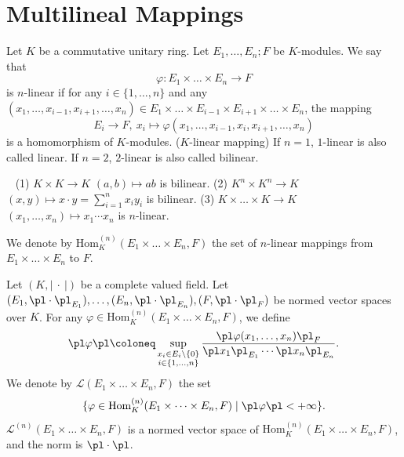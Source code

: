 \section{Multilineal Mappings}
\begin{definitionenv}
    Let $K$ be a commutative unitary ring. Let $E_1,\ldots,E_n;F$ be $K$-modules. We say that 
    $$\varphi:E_1\times\ldots\times E_n\longrightarrow F$$
    is $n$-linear if for any $i\in\{1,\ldots,n\}$ and any $(x_1,\ldots,x_{i-1},x_{i+1},\ldots,x_n)\in E_1\times\ldots\times E_{i-1}\times E_{i+1}\times\ldots\times E_n$, the mapping
    $$E_i\longrightarrow F,\ x_i\mapsto \varphi(x_1,\ldots,x_{i-1},x_i,x_{i+1},\ldots,x_n)$$
    is a homomorphism of $K$-modules. ($K$-linear mapping)
    \newline
    If $n=1$, $1$-linear is also called linear.
    \newline
    If $n=2$, $2$-linear is also called bilinear.
\end{definitionenv}
\begin{exampleenv}
    \ \newline
    (1) $K\times K\longrightarrow K$ $(a,b)\longmapsto ab$ is bilinear.
    \newline
    (2) $K^n\times K^n\longrightarrow K$ $(x,y)\longmapsto x\cdot y=\sum_{i=1}^n x_i y_i$ is bilinear.
    \newline
    (3) $K\times \ldots \times K\longrightarrow K$ $(x_1,\ldots,x_n)\longmapsto x_1\cdots x_n$ is $n$-linear.
\end{exampleenv}
\begin{definitionenv}
    We denote by $\mathrm{Hom}_{K}^{(n)} (E_1\times\ldots\times E_n,F)$ the set of $n$-linear mappings from $E_1\times\ldots\times E_n$ to $F$.
\end{definitionenv}
\begin{definitionenv}
    Let $(K,\left|\ \cdot\ \right|)$ be a complete valued field. 
    \newline
    Let $(E_1,\pl\cdot\pl_{E_1}),\ldots,(E_n,\pl\cdot\pl_{E_n}),(F,\pl\cdot\pl_F)$ be normed vector spaces over $K$. For any $\varphi\in \mathrm{Hom}_{K}^{(n)}(E_1\times\ldots\times E_n,F)$, we define
    $$\pl \varphi\pl \coloneq \sup_{\substack{x_i\in E_i\setminus\{0\}\\i\in\{1,\ldots,n\}}}\frac{\pl \varphi(x_1,\ldots,x_n)\pl_F}{\pl x_1\pl_{E_1}\cdots \pl x_n\pl_{E_n}}.$$
    We denote by $\mathscr{L}(E_1\times\dots\times E_n,F)$ the set
    $$\{\varphi\in \mathrm{Hom}_{K}^{(n)}(E_1\times\dots\times E_n,F)\mid \pl \varphi\pl<+\infty\}.$$
    $\mathscr{L}^{(n)}(E_1\times\ldots\times E_n,F)$ is a normed vector space of $\mathrm{Hom}_{K}^{(n)}(E_1\times\ldots\times E_n,F)$, and the norm is $\pl\cdot\pl$. 
\end{definitionenv}
